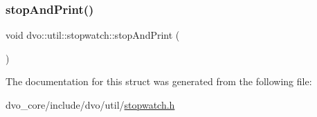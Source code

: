 \mbox{\label{structdvo_1_1util_1_1stopwatch_a216a413789cc4fe6332303c7333b5a05}} 
\subsubsection{\texorpdfstring{stop\+And\+Print()}{stopAndPrint()}}
{\footnotesize\ttfamily void dvo\+::util\+::stopwatch\+::stop\+And\+Print (\begin{DoxyParamCaption}{ }\end{DoxyParamCaption})\hspace{0.3cm}{\ttfamily [inline]}}



The documentation for this struct was generated from the following file\+:\begin{DoxyCompactItemize}
\item 
dvo\+\_\+core/include/dvo/util/\mbox{\hyperlink{stopwatch_8h}{stopwatch.\+h}}\end{DoxyCompactItemize}

